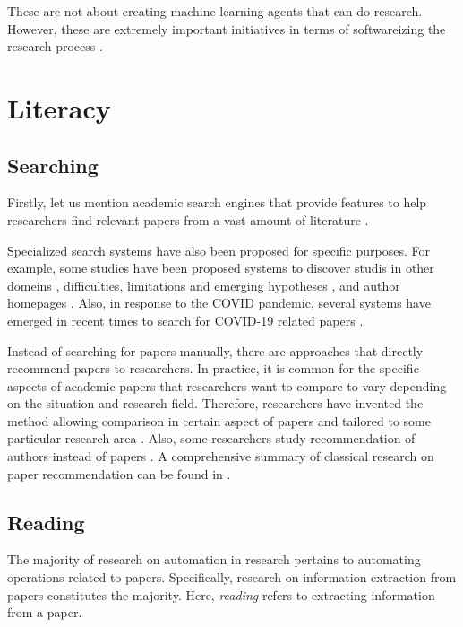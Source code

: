 \documentclass{book}
\begin{document}
These are not about creating machine learning agents that can do research. However, these are extremely important initiatives in terms of softwareizing the research process \cite{deelman2015pegasus,gil2011semantic}.

\section{Literacy}

\subsection{Searching}

Firstly, let us mention academic search engines that provide features to help researchers find relevant papers from a vast amount of literature \cite{googlescholar,semanticscholar,dblp,pubmed,citeseerx}. 

Specialized search systems have also been proposed for specific purposes. For example, some studies have been proposed systems to discover studis in other domeins \cite{kang2022augmenting}, difficulties, limitations and emerging hypotheses \cite{lahav2022search}, and author homepages \cite{patel2021author}. Also, in response to the COVID pandemic, several systems have emerged in recent times to search for COVID-19 related papers \cite{hope2020scisight}.

Instead of searching for papers manually, there are approaches that directly recommend papers to researchers. In practice, it is common for the specific aspects of academic papers that researchers want to compare to vary depending on the situation and research field. Therefore, researchers have invented the method allowing comparison in certain aspect of papers \cite{ostendorff2020aspect} and tailored to some particular research area \cite{breitinger2022recommending}. Also, some researchers study recommendation of authors instead of papers \cite{portenoy2022bursting}. A comprehensive summary of classical research on paper recommendation can be found in \cite{bai2019scientific}.

\subsection{Reading}
The majority of research on automation in research pertains to automating operations related to papers. Specifically, research on information extraction from papers constitutes the majority. Here, \textit{reading} refers to extracting information from a paper.
\end{document}
